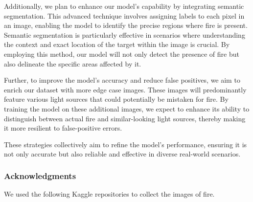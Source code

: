 Additionally, we plan to enhance our model's capability by integrating semantic segmentation. This advanced technique involves assigning labels to each pixel in an image, enabling the model to identify the precise regions where fire is present. Semantic segmentation is particularly effective in scenarios where understanding the context and exact location of the target within the image is crucial. By employing this method, our model will not only detect the presence of fire but also delineate the specific areas affected by it.

Further, to improve the model's accuracy and reduce false positives, we aim to enrich our dataset with more edge case images. These images will predominantly feature various light sources that could potentially be mistaken for fire. By training the model on these additional images, we expect to enhance its ability to distinguish between actual fire and similar-looking light sources, thereby making it more resilient to false-positive errors.

These strategies collectively aim to refine the model's performance, ensuring it is not only accurate but also reliable and effective in diverse real-world scenarios.

\subsubsection*{Acknowledgments}

We used the following Kaggle repositories to collect the images of fire.

